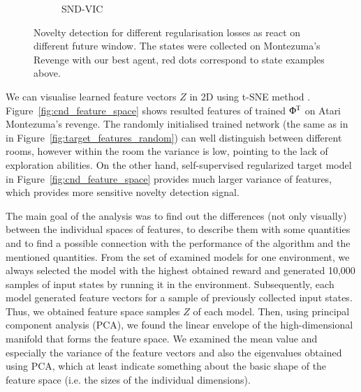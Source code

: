 \documentclass[a4paper,11pt]{elsarticle}
\begin{document}
\begin{figure}[t!]
\begin{subfigure}{1.0\textwidth}
    \caption{SND-VIC}
    \label{fig:nov_vicreg_result_summary}
   \end{subfigure}
\caption{Novelty detection for different regularisation losses as react on different future window. The states were collected on Montezuma's Revenge with our best agent, red dots correspond to state examples above.}
\end{figure}

We can visualise learned feature vectors $Z$ in 2D using t-SNE method \citep{tSNE2008}. Figure~\ref{fig:cnd_feature_space} shows resulted features of trained $\Phi^{\rm T}$ on Atari Montezuma's revenge. The randomly initialised trained network (the same as in \cite{burda2018exploration} in Figure~\ref{fig:target_features_random}) can well distinguish between different rooms, however within the room the variance is low, pointing to the lack of exploration abilities. On the other hand, self-supervised regularized target model in Figure~\ref{fig:cnd_feature_space} provides much larger variance of features, which provides more sensitive novelty detection signal.

The main goal of the analysis was to find out the differences (not only visually) between the individual spaces of features, to describe them with some quantities and to find a possible connection with the performance of the algorithm and the mentioned quantities. From the set of examined models for one environment, we always selected the model with the highest obtained reward and generated 10,000 samples of input states by running it in the environment. Subsequently, each model generated feature vectors for a sample of previously collected input states. Thus, we obtained feature space samples $Z$ of each model. Then, using principal component analysis (PCA), we found the linear envelope of the high-dimensional manifold that forms the feature space. We examined the mean value and especially the variance of the feature vectors and also the eigenvalues obtained using PCA, which at least indicate something about the basic shape of the feature space (i.e. the sizes of the individual dimensions).
\end{document}
